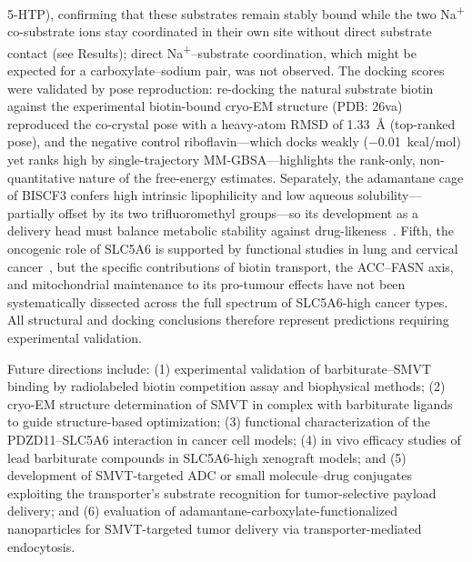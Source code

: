 \documentclass[10pt,letterpaper]{article}
\begin{document}
5-HTP), confirming that these substrates remain stably bound while the two Na\textsuperscript{+} co-substrate ions stay coordinated in their own site without direct substrate contact (see Results); direct Na\textsuperscript{+}--substrate coordination, which might be expected for a carboxylate--sodium pair, was not observed. The docking scores were validated by pose reproduction: re-docking the natural substrate biotin against the experimental biotin-bound cryo-EM structure (PDB: 26va) reproduced the co-crystal pose with a heavy-atom RMSD of 1.33~\AA{} (top-ranked pose), and the negative control riboflavin---which docks weakly ($-$0.01~kcal/mol) yet ranks high by single-trajectory MM-GBSA---highlights the rank-only, non-quantitative nature of the free-energy estimates. Separately, the adamantane cage of BISCF3 confers high intrinsic lipophilicity and low aqueous solubility---partially offset by its two trifluoromethyl groups---so its development as a delivery head must balance metabolic stability against drug-likeness~\cite{wanka2013,dane2025}. Fifth, the oncogenic role of SLC5A6 is supported by functional studies in lung and cervical cancer~\cite{zheng2025,wang2026}, but the specific contributions of biotin transport, the ACC--FASN axis, and mitochondrial maintenance to its pro-tumour effects have not been systematically dissected across the full spectrum of SLC5A6-high cancer types. All structural and docking conclusions therefore represent predictions requiring experimental validation.

Future directions include: (1) experimental validation of barbiturate--SMVT binding by radiolabeled biotin competition assay and biophysical methods; (2) cryo-EM structure determination of SMVT in complex with barbiturate ligands to guide structure-based optimization; (3) functional characterization of the PDZD11--SLC5A6 interaction in cancer cell models; (4) in vivo efficacy studies of lead barbiturate compounds in SLC5A6-high xenograft models; and (5) development of SMVT-targeted ADC or small molecule--drug conjugates exploiting the transporter's substrate recognition for tumor-selective payload delivery; and (6) evaluation of adamantane-carboxylate-functionalized nanoparticles for SMVT-targeted tumor delivery via transporter-mediated endocytosis.
\end{document}
